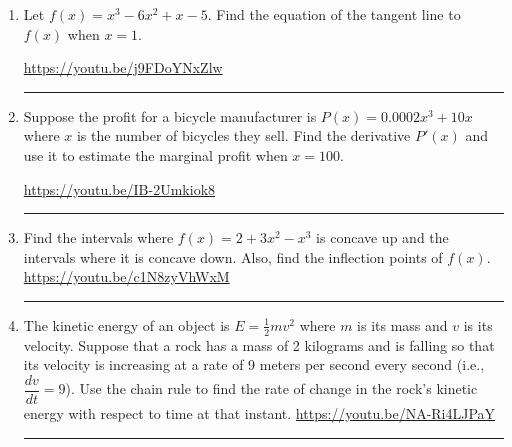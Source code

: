 \documentclass[12pt]{article}
\begin{document}
\begin{enumerate}
\newpage
\item Let $f(x) = x^3 - 6x^2 + x - 5$.  Find the equation of the tangent line to $f(x)$ when $x = 1$.  
\begin{flushright}
\end{flushright}
\hfill \url{https://youtu.be/j9FDoYNxZlw}
\hrule






\item Suppose the profit for a bicycle manufacturer is $P(x) = 0.0002 x^3 + 10x$ where $x$ is the number of bicycles they sell.  Find the derivative $P'(x)$ and use it to estimate the marginal profit when $x=100$. 

\vfill
\hfill \url{https://youtu.be/IB-2Umkiok8}
\hrule


\item Find the intervals where $f(x) = 2+3x^2 - x^3$ is concave up and the intervals where it is concave down.  Also, find the inflection points of $f(x)$.  
\vfill
\hfill \url{https://youtu.be/c1N8zyVhWxM}
\hrule


\item The kinetic energy of an object is $E = \frac{1}{2} m v^2$ where $m$ is its mass and $v$ is its velocity.  Suppose that a rock has a mass of 2 kilograms and is falling so that its velocity is increasing at a rate of 9 meters per second every second (i.e., $\dfrac{dv}{dt} = 9$).  Use the chain rule to find the rate of change in the rock's kinetic energy with respect to time at that instant.  
\vfill
\hfill \url{https://youtu.be/NA-Ri4LJPaY}
\hrule 



\end{enumerate}
\end{document}
